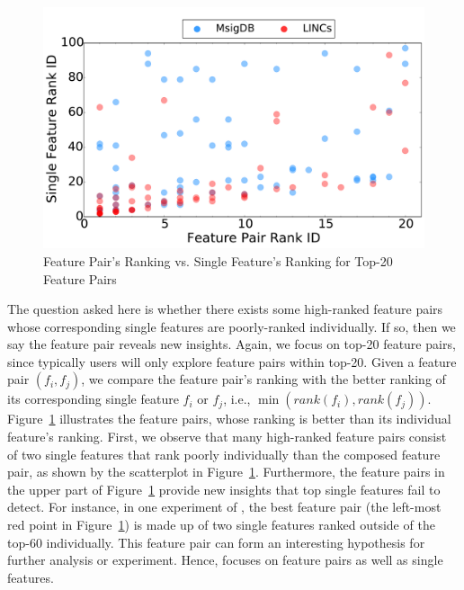 \begin{figure}[h]
\vspace{-5mm}
  \centering
  \includegraphics[width=0.8\linewidth]{fig/better_rank_20.pdf}
  \vspace{-5mm}
\caption{Feature Pair's Ranking vs. Single Feature's Ranking for Top-20 Feature Pairs}
\vspace{-5mm}
\label{fig:better_rank_20}
\end{figure} 

 The question asked here is whether there exists some high-ranked feature pairs whose corresponding single features are poorly-ranked individually. If so, then we say the feature pair reveals new insights. Again, we focus on top-20 feature pairs, since typically users will only explore feature pairs within top-20. Given a feature pair $(f_i,f_j)$, we compare the feature pair's ranking with the better ranking of its corresponding single feature $f_i$ or $f_j$, i.e., $\min(rank(f_i),rank(f_j))$. Figure~\ref{fig:better_rank_20} illustrates the feature pairs, whose ranking is better than its individual feature's ranking. First, we observe that many high-ranked feature pairs consist of two single features that rank poorly individually than the composed feature pair, as shown by the scatterplot in Figure~\ref{fig:better_rank_20}. Furthermore, the feature pairs in the upper part of Figure~\ref{fig:better_rank_20} provide new insights that top single features fail to detect. For instance, in one experiment of \lincs, the best feature pair (the left-most red point in Figure~\ref{fig:better_rank_20}) is made up of two single features ranked outside of the top-60 individually. This feature pair can form an interesting hypothesis for further analysis or experiment. Hence, \genviz focuses on feature pairs as well as single features.



